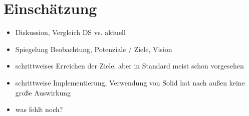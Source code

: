 
\section{Einschätzung}

\begin{itemize}
    \item Diskussion, Vergleich DS vs. aktuell
    \item Spiegelung Beobachtung, Potenziale / Ziele, Vision
    \item schrittweises Erreichen der Ziele, aber in Standard meist schon vorgesehen
    \item schrittweise Implementierung, Verwendung von Solid hat nach außen keine große Auswirkung
    \item was fehlt noch?
\end{itemize}
